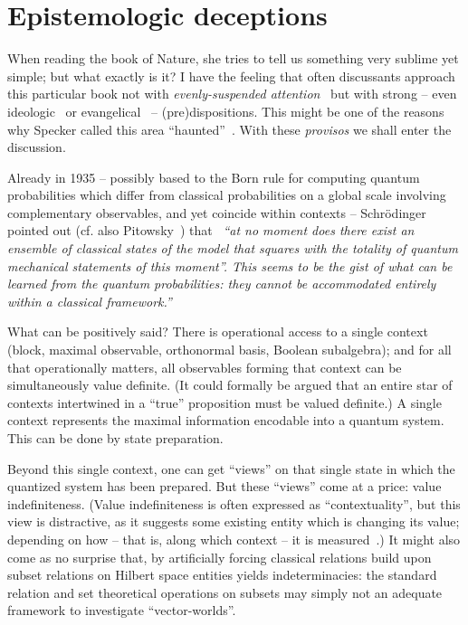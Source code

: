 \section{Epistemologic deceptions}

When reading the book of Nature, she tries to tell us something very sublime yet simple;
but what exactly is it?
I have the feeling that often discussants approach this particular book not with
{\em evenly-suspended attention}~\cite{Freud-1912,Freud-1912-e} but with strong
-- even ideologic~\cite{clauser-talkvie} or evangelical~\cite{zeil-05_nature_ofQuantum}
-- (pre)dispositions.
This might be one of the reasons why Specker called this area ``haunted''~\cite{Specker-priv-Oct2000}.
With these {\em provisos} we shall enter the discussion.


Already in 1935 -- possibly
based to the Born rule for computing quantum probabilities which
differ from classical probabilities on a global scale involving complementary observables,
and yet coincide within contexts --
Schr\"odinger pointed out (cf. also Pitowsky~\cite[footnote~2, p.~96]{Pit-94})
that~\cite[p.~327]{schrodinger-en-10.2307/986572}
{\em ``at no moment does there exist an ensemble of classical states of the model
that squares with the totality of quantum mechanical statements of this moment''.
This seems to be the gist of what can be learned from the quantum probabilities:
they cannot be accommodated entirely within a classical framework.''}

What can be positively said?
There is operational access to a single  context (block, maximal observable, orthonormal basis, Boolean subalgebra);
and for all that operationally matters, all observables forming that context can be simultaneously value definite.
(It could formally be argued that an entire star of contexts intertwined in a ``true'' proposition
must be valued definite.)
A single context represents the maximal information encodable into a quantum system.
This can be done by state preparation.


Beyond this single context,
one can get ``views'' on that single state in which the quantized system has been prepared.
But these ``views'' come at a price: value indefiniteness.
(Value indefiniteness is often expressed as ``contextuality'', but this view is distractive,
as it suggests some existing entity which is changing
its value; depending on how -- that is, along which context -- it is measured~\cite{Svozil-2018-p}.)
It might also come as no surprise that, by
artificially forcing classical relations build upon subset relations on Hilbert space entities
yields indeterminacies: the standard relation and set theoretical operations on subsets may simply not an adequate framework
to investigate ``vector-worlds''.

